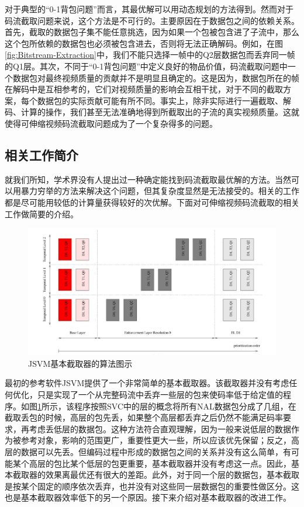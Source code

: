对于典型的“0-1背包问题”而言，其最优解可以用动态规划的方法得到。然而对于码流截取问题来说，这个方法是不可行的。主要原因在于数据包之间的依赖关系。首先，截取的数据包子集不能任意挑选，因为如果一个包被包含进了子流中，那么这个包所依赖的数据包也必须被包含进去，否则将无法正确解码。例如，在图\ref{fig:Bitstream-Extraction}中，我们不能只选择一帧中的Q2层数据包而丢弃同一帧的Q1层。其次，不同于“0-1背包问题”中定义良好的物品价值，码流截取问题中一个数据包对最终视频质量的贡献并不是明显且确定的。这是因为，数据包所在的帧在解码中是互相参考的，它们对视频质量的影响会互相干扰，对于不同的截取方案，每个数据包的实际贡献可能有所不同。事实上，除非实际进行一遍截取、解码、计算的操作，我们甚至无法准确地得到所截取出的子流的真实视频质量。这就使得可伸缩视频码流截取问题成为了一个复杂得多的问题。

\subsection{相关工作简介}

就我们所知，学术界没有人提出过一种确定能找到码流截取最优解的方法。当然可以用暴力穷举的方法来解决这个问题，但其复杂度显然是无法接受的。相关的工作都是尽可能用较低的计算量获得较好的次优解。下面对可伸缩视频码流截取的相关工作做简要的介绍。

\begin{figure}[h]
	\centering
	\includegraphics[width = 1.0\linewidth]{clip/06.png}
	\caption{JSVM基本截取器的算法图示\label{fig:06}}
\end{figure}

最初的参考软件JSVM提供了一个非常简单的基本截取器。该截取器并没有考虑任何优化，只是实现了一个从完整码流中丢弃一些层的包来使码率低于给定值的程序。如图\ref{fig:06}所示，该程序按照SVC中的层的概念将所有NAL数据包分成了几组，在截取丢包的时候，高层的包先丢，如果整个高层都丢弃之后仍然不能满足码率要求，再考虑丢低层的数据包。这种方法符合直观理解，因为一般来说低层的数据作为被参考对象，影响的范围更广，重要性更大一些，所以应该优先保留；反之，高层的数据可以先丢。但编码过程中形成的数据包之间的关系并没有这么简单，有可能某个高层的包比某个低层的包更重要，基本截取器并没有考虑这一点。因此，基本截取器的效果离最优还有很大的差距。此外，对于同一个层的数据包，基本截取是按某个固定的顺序依次丢弃，也并没有对这些同一层数据包的重要性做区分。这也是基本截取器效率低下的另一个原因。接下来介绍对基本截取器的改进工作。

